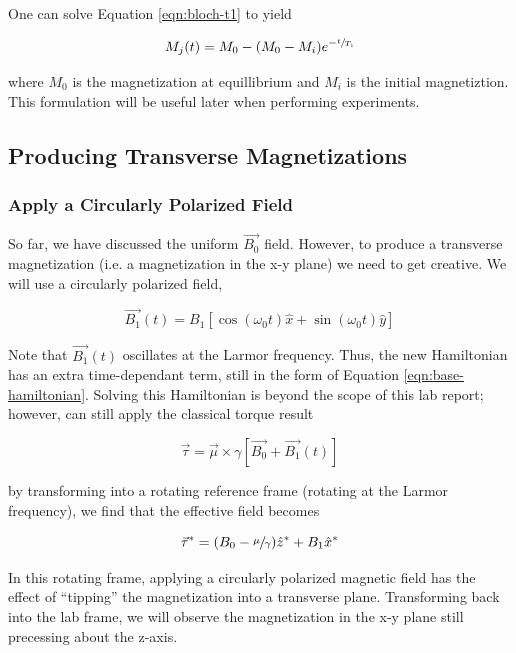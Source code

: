 \documentclass[%
 reprint,
 amsmath,amssymb,
 aps,
]{revtex4-2}
\begin{document}
One can solve Equation \ref{eqn:bloch-t1} to yield

\begin{equation}\label{eqn:decay-eqn}
    M_{j}(t) = M_0 - (M_0 - M_i)e^{-\sfrac{t}{T_1}}
\end{equation}

where $M_0$ is the magnetization at equillibrium and $M_i$ is the initial magnetiztion. This formulation will be useful later when performing experiments. 

\subsection{\label{sec:tipping}Producing Transverse Magnetizations}

\subsubsection{Apply a Circularly Polarized Field}

So far, we have discussed the uniform $\vec{B_0}$ field. However, to produce a transverse magnetization (i.e. a magnetization in the x-y plane) we need to get creative. We will use a circularly polarized field, 

\begin{equation}
    \vec{B_1}(t) = B_1\left[\cos(\omega_0t)\hat{x}+\sin(\omega_0t)\hat{y}\right]
\end{equation}

Note that $\vec{B_1}(t)$ oscillates at the Larmor frequency. Thus, the new Hamiltonian has an extra time-dependant term, still in the form of Equation \ref{eqn:base-hamiltonian}. Solving this Hamiltonian is beyond the scope of this lab report; however, can still apply the classical torque result 

\begin{equation}
    \vec{\tau} = \vec{\mu} \times \gamma \left[\vec{B_0}+\vec{B_1}(t)\right]
\end{equation}

by transforming into a rotating reference frame (rotating at the Larmor frequency), we find that the effective field becomes 

\begin{equation}
    \vec{\tau}^* = (B_0 - \sfrac{\mu}{\gamma}) \hat{z}^*+ B_1 \hat{x}^*
\end{equation}

In this rotating frame, applying a circularly polarized magnetic field has the effect of ``tipping'' the magnetization into a transverse plane. Transforming back into the lab frame, we will observe the magnetization in the x-y plane still precessing about the z-axis. 
\end{document}
